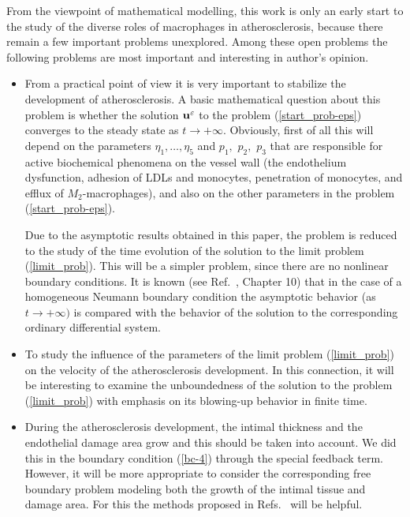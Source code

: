 \documentclass[reqno]{amsart}            %
\numberwithin{equation}{section}
\begin{document}
From the viewpoint of mathematical modelling, this work is only an early start to the study of the
diverse roles of macrophages in atherosclerosis, because there remain a few important problems unexplored.
Among these open problems the following problems are most important and interesting  in author's opinion.
\begin{itemize}
  \item
From a practical point of view it is very important to stabilize the development of atherosclerosis.
A basic mathematical question about this problem is whether the solution ${\bf u}^\varepsilon$ to the problem (\ref{start_prob-eps}) converges
to the steady state as $t\to +\infty.$ Obviously, first of all this will depend on the parameters $\eta_1,\ldots,\eta_5$ and $p_1,$ $p_2,$ $p_3$
that are responsible for active biochemical phenomena on the vessel wall (the endothelium dysfunction, adhesion of LDLs and monocytes,
penetration of monocytes, and efflux of $M_2$-macrophages), and also on the other parameters in the problem (\ref{start_prob-eps}).

\smallskip

Due to the asymptotic results obtained in this paper,  the problem is reduced to the study of the time evolution of the solution to the limit problem (\ref{limit_prob}).  This will be a simpler problem, since there are no nonlinear boundary conditions. It is known (see Ref.~\cite{Pao}, Chapter 10) that in the case of a homogeneous Neumann boundary condition the asymptotic behavior (as $t\to +\infty)$ is compared with the behavior of the solution to the corresponding ordinary differential system.

\smallskip
\item
To study the influence of the parameters of the limit problem (\ref{limit_prob}) on the velocity of  the atherosclerosis development. In this connection, it will be interesting to examine the unboundedness of the solution to the problem (\ref{limit_prob}) with emphasis on its blowing-up behavior in finite time.

\smallskip
  \item
During the atherosclerosis development, the intimal thickness and the endothelial damage area grow and this should be taken into account.
We did this in the boundary condition (\ref{bc-4}) through the special  feedback term. However, it will be more appropriate to consider the corresponding free boundary problem modeling both the growth  of the  intimal tissue and damage area.
 For this the methods proposed in Refs.~\cite{Baz-Fried-1,Baz-Fried-2,Byrne-99,Bel-Prez,Bel_growth} will be helpful.
\end{itemize}
\end{document}
